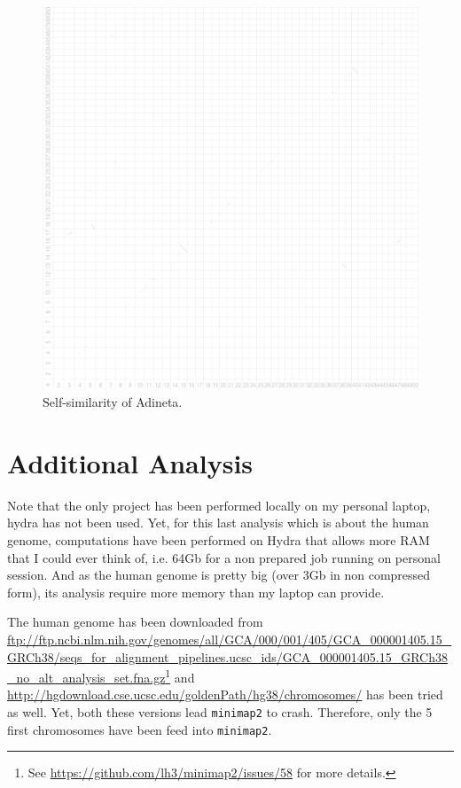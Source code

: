 \documentclass{article}
\begin{document}
\begin{figure}
	\hspace{-1cm}
	\includegraphics[width=1.1\textwidth]{figs/Adineta_Adineta.eps}
	\caption{Self-similarity of Adineta.\label{fig:Adi-Adi}}
\end{figure}

\newpage
\section{Additional Analysis}

Note that the only project has been performed locally on my personal laptop, hydra has not been used.
Yet, for this last analysis which is about the human genome, computations have been performed on Hydra that
allows more RAM that I could ever think of, i.e. 64Gb for a non prepared job running on personal session.
And as the human genome is pretty big (over 3Gb in non compressed form), its analysis require more memory
than my laptop can provide.

The human genome has been downloaded from \url{ftp://ftp.ncbi.nlm.nih.gov/genomes/all/GCA/000/001/405/GCA_000001405.15_GRCh38/seqs_for_alignment_pipelines.ucsc_ids/GCA_000001405.15_GRCh38_no_alt_analysis_set.fna.gz}\footnote{See \url{https://github.com/lh3/minimap2/issues/58}
for more details.} and \url{http://hgdownload.cse.ucsc.edu/goldenPath/hg38/chromosomes/} has been tried as well. Yet, both
these versions lead \texttt{minimap2} to crash. Therefore, only the 5 first chromosomes have been feed into \texttt{minimap2}.
\end{document}
